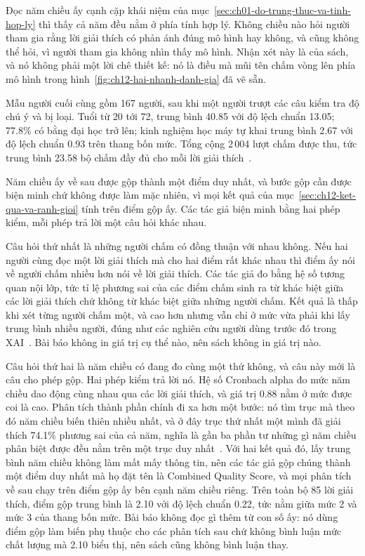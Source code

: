 Đọc năm chiều ấy cạnh cặp khái niệm của
mục~\ref{sec:ch01-do-trung-thuc-va-tinh-hop-ly} thì thấy cả năm đều nằm ở phía
tính hợp lý. Không chiều nào hỏi người tham gia rằng lời giải thích có phản
ánh đúng mô hình hay không, và cũng không thể hỏi, vì người tham gia không
nhìn thấy mô hình. Nhận xét này là của sách, và nó không phải một lời chê
thiết kế: nó là điều mà mũi tên chấm vòng lên phía mô hình trong
hình~\ref{fig:ch12-hai-nhanh-danh-gia} đã vẽ sẵn.

%
Mẫu người cuối cùng gồm 167 người, sau khi một người trượt các câu kiểm tra
độ chú ý và bị loại. Tuổi từ 20 tới 72, trung bình 40.85 với độ lệch chuẩn
13.05; 77.8\% có bằng đại học trở lên; kinh nghiệm học máy tự khai trung bình
2.67 với độ lệch chuẩn 0.93 trên thang bốn mức. Tổng cộng 2\,004 lượt chấm được
thu, tức trung bình 23.58 bộ chấm đầy đủ cho mỗi lời giải
thích~\autocite{p25userperception}.

Năm chiều ấy về sau được gộp thành một điểm duy nhất, và bước gộp cần được
biện minh chứ không được làm mặc nhiên, vì mọi kết quả của
mục~\ref{sec:ch12-ket-qua-va-ranh-gioi} tính trên điểm gộp ấy. Các tác giả
biện minh bằng hai phép kiểm, mỗi phép trả lời một câu hỏi khác nhau.

Câu hỏi thứ nhất là những người chấm có đồng thuận với nhau không. Nếu hai
người cùng đọc một lời giải thích mà cho hai điểm rất khác nhau thì điểm ấy
nói về người chấm nhiều hơn nói về lời giải thích. Các tác giả đo bằng hệ số
tương quan nội lớp, tức tỉ lệ phương sai của các điểm chấm sinh ra từ khác
biệt giữa các lời giải thích chứ không từ khác biệt giữa những người chấm. Kết
quả là thấp khi xét từng người chấm một, và cao hơn nhưng vẫn chỉ ở mức vừa
phải khi lấy trung bình nhiều người, đúng như các nghiên cứu người dùng trước
đó trong XAI~\autocite{p25userperception}. Bài báo không in giá trị cụ thể
nào, nên sách không in giá trị nào.

Câu hỏi thứ hai là năm chiều có đang đo cùng một thứ không, và câu này mới là
câu cho phép gộp. Hai phép kiểm trả lời nó. Hệ số Cronbach alpha đo mức năm
chiều dao động cùng nhau qua các lời giải thích, và giá trị 0.88 nằm ở mức
được coi là cao. Phân tích thành phần chính đi xa hơn một bước: nó tìm trục mà
theo đó năm chiều biến thiên nhiều nhất, và ở đây trục thứ nhất một mình đã
giải thích 74.1\% phương sai của cả năm, nghĩa là gần ba phần tư những gì năm
chiều phân biệt được đều nằm trên một trục duy
nhất~\autocite{p25userperception}. Với hai kết quả đó, lấy trung bình năm
chiều không làm mất mấy thông tin, nên các tác giả gộp chúng thành một điểm
duy nhất mà họ đặt tên là Combined Quality Score, và mọi phân tích về sau chạy
trên điểm gộp ấy bên cạnh năm chiều riêng. Trên toàn bộ 85 lời giải thích,
điểm gộp trung bình là 2.10 với độ lệch chuẩn 0.22, tức nằm giữa mức 2 và mức 3
của thang bốn mức. Bài báo không đọc gì thêm từ con số ấy: nó dùng điểm gộp làm
biến phụ thuộc cho các phân tích sau chứ không bình luận mức chất lượng mà 2.10
biểu thị, nên sách cũng không bình luận thay.

